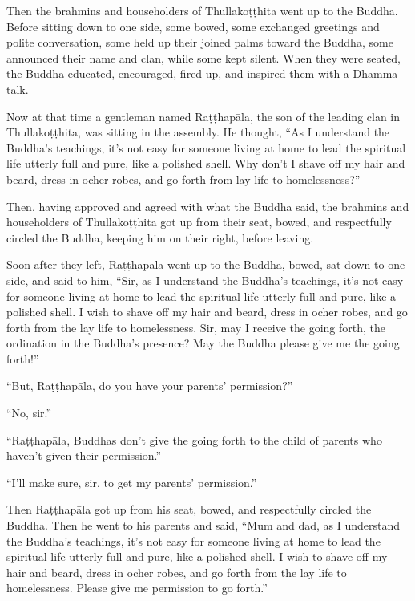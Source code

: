 \documentclass[12pt,openany]{book}%
\begin{document}
Then the brahmins and householders of \textsanskrit{Thullakoṭṭhita} went up to the Buddha. Before sitting down to one side, some bowed, some exchanged greetings and polite conversation, some held up their joined palms toward the Buddha, some announced their name and clan, while some kept silent. When they were seated, the Buddha educated, encouraged, fired up, and inspired them with a Dhamma talk. 

Now at that time a gentleman named \textsanskrit{Raṭṭhapāla}, the son of the leading clan in \textsanskrit{Thullakoṭṭhita}, was sitting in the assembly. He thought, “As I understand the Buddha’s teachings, it’s not easy for someone living at home to lead the spiritual life utterly full and pure, like a polished shell. Why don’t I shave off my hair and beard, dress in ocher robes, and go forth from lay life to homelessness?” 

Then, having approved and agreed with what the Buddha said, the brahmins and householders of \textsanskrit{Thullakoṭṭhita} got up from their seat, bowed, and respectfully circled the Buddha, keeping him on their right, before leaving. 

Soon after they left, \textsanskrit{Raṭṭhapāla} went up to the Buddha, bowed, sat down to one side, and said to him, “Sir, as I understand the Buddha’s teachings, it’s not easy for someone living at home to lead the spiritual life utterly full and pure, like a polished shell. I wish to shave off my hair and beard, dress in ocher robes, and go forth from the lay life to homelessness. Sir, may I receive the going forth, the ordination in the Buddha’s presence? May the Buddha please give me the going forth!” 

“But, \textsanskrit{Raṭṭhapāla}, do you have your parents’ permission?” 

“No, sir.” 

“\textsanskrit{Raṭṭhapāla}, Buddhas don’t give the going forth to the child of parents who haven’t given their permission.” 

“I’ll make sure, sir, to get my parents’ permission.” 

Then \textsanskrit{Raṭṭhapāla} got up from his seat, bowed, and respectfully circled the Buddha. Then he went to his parents and said, “Mum and dad, as I understand the Buddha’s teachings, it’s not easy for someone living at home to lead the spiritual life utterly full and pure, like a polished shell. I wish to shave off my hair and beard, dress in ocher robes, and go forth from the lay life to homelessness. Please give me permission to go forth.” 
\end{document}

